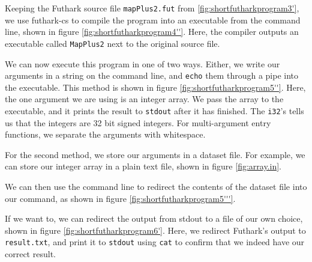 Keeping the Futhark source file \texttt{mapPlus2.fut} from
\ref{fig:shortfutharkprogram3'}, we use futhark-cs to compile the program into
an executable from the command line, shown in figure \ref{fig:shortfutharkprogram4''}.
Here, the compiler outputs an executable called \texttt{MapPlus2} next to the
original source file.

We can now execute this program in one of two ways.
Either, we write our arguments in a string on the command line, and
\texttt{echo} them through a pipe into the executable. This method is shown in
figure \ref{fig:shortfutharkprogram5''}. Here, the one argument we are using is
an integer array. We pass the array to the executable, and it prints the result
to \texttt{stdout} after it has finished. The \texttt{i32}'s tells us that the
integers are 32 bit signed integers.
For multi-argument entry functions, we separate the arguments with whitespace.

For the second method, we store our arguments in a dataset file. For example, we
can store our integer array in a plain text file, shown in figure \ref{fig:array.in}.

We can then use the command line to redirect the contents of the dataset file
into our command, as shown in figure \ref{fig:shortfutharkprogram5'''}.

If we want to, we can redirect the output from stdout to a file of our own
choice, shown in figure \ref{fig:shortfutharkprogram6'}. Here, we redirect
Futhark's output to \texttt{result.txt}, and print it to \texttt{stdout} using
\texttt{cat} to confirm that we indeed have our correct result.




